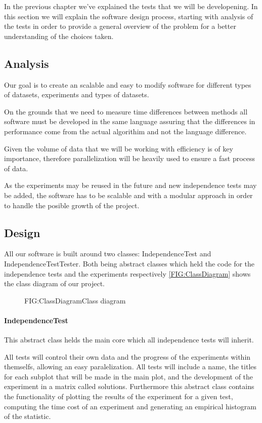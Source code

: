 In the previous chapter we've explained the tests that we will be developening. In this section we will explain the software design process, starting with analysis of the tests in order to provide a general overview of the problem for a better understanding of the choices taken.
\subsection{Analysis}

Our goal is to create an scalable and easy to modify software for different types of datasets, experiments and types of datasets.

On the grounds that we need to measure time differences between methods all software must be developed in the same language assuring that the differences in performance come from the actual algorithim and not the language difference.

Given the volume of data that we will be working with efficiency is of key importance, therefore parallelization will be heavily used to ensure a fast process of data. 

As the experiments may be reused in the future and new independence tests may be added, the software has to be scalable and with a  modular approach in order to handle the posible growth of the project.

\subsection{Design}

All our software is built around two classes: IndependenceTest and IndependenceTestTester. Both being abstract classes which held the code for the independence tests and the experiments respectively \ref{FIG:ClassDiagram} shows the class diagram of our project.

\begin{figure}[Class diagram]{FIG:ClassDiagram}{Class diagram}
\end{figure}

\paragraph{IndependenceTest}

This abstract class helds the main core which all independence tests will inherit.

All tests will control their own data and the progress of the experiments within themselfs, allowing an easy paralelization. All tests will include a name, the titles for each subplot that will be made in the main plot, and the development of the experiment in a matrix called solutions.
Furthermore this abstract class contains the functionality of plotting the results of the experiment for a given test, computing the time cost of an experiment and generating an empirical histogram of the statistic.

